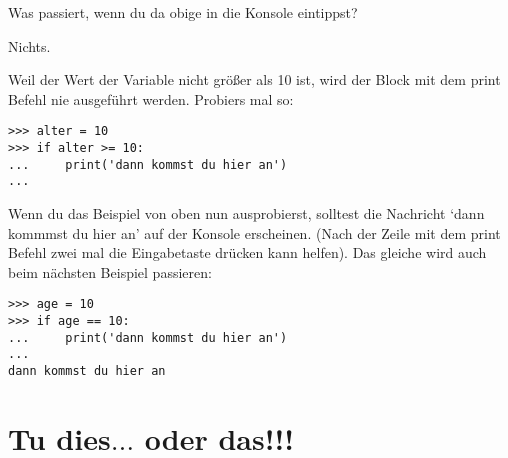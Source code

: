 \noindent
Was passiert, wenn du da obige in die Konsole eintippst?
\par
\noindent
Nichts.
\par
\noindent
Weil der Wert der Variable  nicht größer als 10 ist, wird der Block mit dem print Befehl nie ausgeführt werden. Probiers mal so:

\begin{listingignore}
\begin{verbatim}
>>> alter = 10
>>> if alter >= 10:
...     print('dann kommst du hier an')
...
\end{verbatim}
\end{listingignore}

Wenn du das Beispiel von oben nun ausprobierst, solltest die Nachricht `dann kommmst du hier an' auf der Konsole erscheinen. (Nach der Zeile mit dem print Befehl zwei mal die Eingabetaste drücken kann helfen). Das gleiche wird auch beim nächsten Beispiel passieren:

\begin{listing}
\begin{verbatim}
>>> age = 10
>>> if age == 10:
...     print('dann kommst du hier an')
...
dann kommst du hier an
\end{verbatim}
\end{listing}

\section{Tu dies$\ldots$ oder das!!!}

